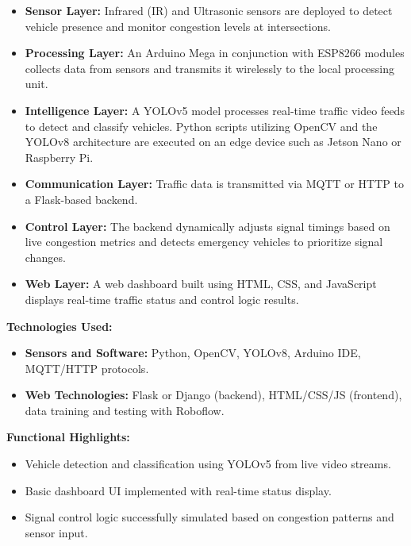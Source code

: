 \documentclass[12pt]{report}
\begin{document}
\begin{itemize}
    \item \textbf{Sensor Layer:} Infrared (IR) and Ultrasonic sensors are deployed to detect vehicle presence and monitor congestion levels at intersections.
    
    \item \textbf{Processing Layer:} An Arduino Mega in conjunction with ESP8266 modules collects data from sensors and transmits it wirelessly to the local processing unit.
    
    \item \textbf{Intelligence Layer:} A YOLOv5 model processes real-time traffic video feeds to detect and classify vehicles. Python scripts utilizing OpenCV and the YOLOv8 architecture are executed on an edge device such as Jetson Nano or Raspberry Pi.
    
    \item \textbf{Communication Layer:} Traffic data is transmitted via MQTT or HTTP to a Flask-based backend.
    
    \item \textbf{Control Layer:} The backend dynamically adjusts signal timings based on live congestion metrics and detects emergency vehicles to prioritize signal changes.
    
    \item \textbf{Web Layer:} A web dashboard built using HTML, CSS, and JavaScript displays real-time traffic status and control logic results. 
\end{itemize}

\vspace{0.3cm}

\textbf{Technologies Used:}
\begin{itemize}
    \item \textbf{Sensors and Software:} Python, OpenCV, YOLOv8, Arduino IDE, MQTT/HTTP protocols.
    \item \textbf{Web Technologies:} Flask or Django (backend), HTML/CSS/JS (frontend), data training and testing with Roboflow.
\end{itemize}

\vspace{0.3cm}

\textbf{Functional Highlights:}
\begin{itemize}
    \item Vehicle detection and classification using YOLOv5 from live video streams.
    \item Basic dashboard UI implemented with real-time status display.
    \item Signal control logic successfully simulated based on congestion patterns and sensor input.
\end{itemize}
\end{document}

